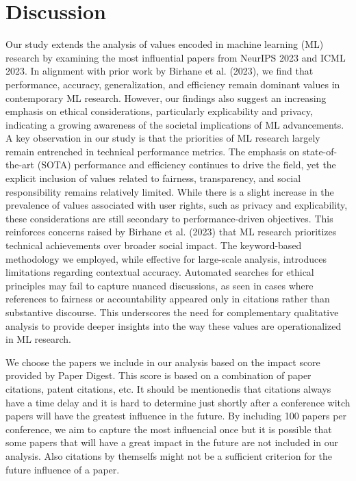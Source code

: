 \documentclass{article}
\begin{document}
\section{Discussion}
\label{sec:discussion}
Our study extends the analysis of values encoded in machine learning (ML) research by examining the most influential papers from NeurIPS 2023 and ICML 2023. In alignment with prior work by Birhane et al. (2023), 
we find that performance, accuracy, generalization, and efficiency remain dominant values in contemporary ML research. However, our findings also suggest an increasing emphasis on ethical considerations, particularly 
explicability and privacy, indicating a growing awareness of the societal implications of ML advancements.
A key observation in our study is that the priorities of ML research largely remain entrenched in technical performance metrics. The emphasis on state-of-the-art (SOTA) performance and efficiency continues to drive the field, 
yet the explicit inclusion of values related to fairness, transparency, and social responsibility remains relatively limited. While there is a slight increase in the prevalence of values associated with user rights, such as 
privacy and explicability, these considerations are still secondary to performance-driven objectives. This reinforces concerns raised by Birhane et al. (2023) that ML research prioritizes technical achievements over broader 
social impact.
The keyword-based methodology we employed, while effective for large-scale analysis, introduces limitations regarding contextual accuracy. Automated searches for ethical principles may fail to capture nuanced discussions, 
as seen in cases where references to fairness or accountability appeared only in citations rather than substantive discourse. This underscores the need for complementary qualitative analysis to provide deeper insights into 
the way these values are operationalized in ML research.

We choose the papers we include in our analysis based on the impact score provided by Paper Digest. This score is based on a combination of paper citations, patent citations, etc. It should be mentionedis that
citations always have a time delay and it is hard to determine just shortly after a conference witch papers will have the greatest influence in the future. By including 100 papers per conference, we aim to 
capture the most influencial once but it is possible that some papers that will have a great impact in the future are not included in our analysis. Also citations by themselfs might not be a sufficient criterion for the future influence of a paper. 
\end{document}
